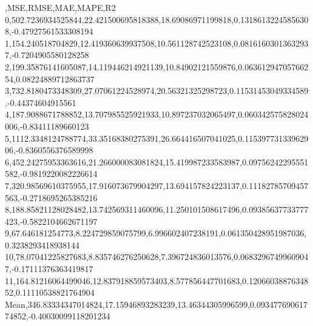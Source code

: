 ,MSE,RMSE,MAE,MAPE,R2
0,502.7236934525844,22.421500695818388,18.69086971199818,0.13186132245856308,-0.47927561533308194
1,154.240518704829,12.419360639937508,10.561128742523108,0.08161603013632937,-0.7204905580128258
2,199.35876141605087,14.119446214921139,10.84902121559876,0.06361294705766254,0.08224889712863737
3,732.8180473348309,27.07061224528974,20.56321325298723,0.11531453049334589,-0.44374604915561
4,187.9088671788852,13.707985525921933,10.897237032065497,0.060342575828024006,-0.83411189660123
5,1112.3348124788774,33.35168380275391,26.664416507041025,0.11539773133962906,-0.8360556376589998
6,452.24275953363616,21.266000083081824,15.419987233583987,0.09756242295551582,-0.9819220082226614
7,320.98569610375955,17.916073679904297,13.694157824223137,0.11182785709457563,-0.2718695265385216
8,188.85821128028482,13.742569311460096,11.250101508617496,0.09385637733777423,-0.5822104662671197
9,67.646181254773,8.224729859075799,6.996602407238191,0.061350428951987036,0.3238293418938144
10,78.07041225827683,8.835746276250628,7.396724836013576,0.06832967499609047,-0.17111376363419817
11,164.81216064499046,12.837918859573403,8.577856447701683,0.1206603887634852,0.11110538821764904
Mean,346.83334347014824,17.15946893283239,13.46344305996599,0.09347769061774852,-0.40030099118201234
